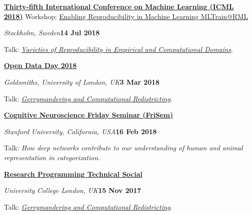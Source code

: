\documentclass[10pt]{article}
\newenvironment{outerlist}[1][\enskip\textbullet]%
        {\begin{itemize}[#1]}{\end{itemize}%
         \vspace{-.6\baselineskip}}
\newenvironment{innerlist}[1][\enskip\textbullet]%
        {\begin{compactitem}[#1]}{\end{compactitem}}
\begin{document}
\begin{samepage}

\textbf{\href{https://icml.cc}{Thirty-fifth International Conference on Machine Learning (ICML 2018)}}
\newline Workshop: \href{https://mltrain.cc/events/enabling-reproducibility-in-machine-learning-mltrainrml-icml-2018/}{Enabling Reproducibility in Machine Learning MLTrain@RML}
\begin{outerlist}
  \item[] \textit{Stockholm, Sweden}\hfill\textbf{14 Jul 2018}
  \begin{innerlist}
    \item Talk:  \textit{\href{https://figshare.com/articles/Varieties_of_Reproducibility_in_Empirical_and_Computational_Domains/6818018}{Varieties of Reproducibility in Empirical and Computational Domains}}.
  \end{innerlist}
\end{outerlist}
\vspace{8pt}\end{samepage}


\textbf{\href{http://opendataday.org/}{Open Data Day 2018}}
\begin{outerlist}
  \item[] \textit{Goldsmiths, University of London, UK}\hfill\textbf{3 Mar 2018}
  \begin{innerlist}
    \item Talk:  \textit{\href{http://figshare.com/articles/Gerrymandering_and_Computational_Redistricting/5605387}{Gerrymandering and Computational Redistricting}}.
  \end{innerlist}
\end{outerlist}
\vspace{8pt}

\textbf{\href{https://psychology.stanford.edu/events/frisem}{Cognitive Neuroscience Friday Seminar (FriSem)}}
\begin{outerlist}
  \item[] \textit{Stanford University, California, USA}\hfill\textbf{16 Feb 2018}
  \begin{innerlist}
    \item Talk: \textit{How deep networks contribute to our understanding of human and animal representation in categorization}.
  \end{innerlist}
\end{outerlist}
\vspace{8pt}

\textbf{\href{http://www.ucl.ac.uk/research-it-services/research-software-development/programming-hub/tech-socials}{Research Programming Technical Social}}
\begin{outerlist}
  \item[] \textit{University College London, UK}\hfill\textbf{15 Nov 2017}
  \begin{innerlist}
    \item Talk: \textit{\href{https://figshare.com/articles/Gerrymandering_and_Computational_Redistricting/5605387/3}{Gerrymandering and Computational Redistricting}}.
  \end{innerlist}
\end{outerlist}
\vspace{8pt}
\end{document}
